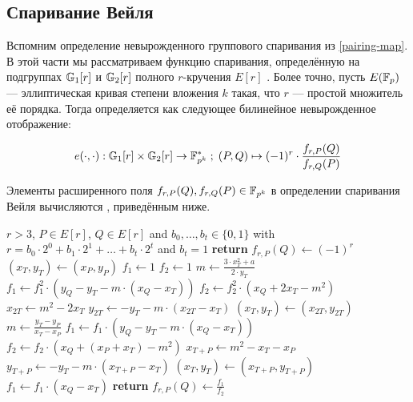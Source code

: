 \subsection{Спаривание Вейля}
\label{sec:weil-pairing} Вспомним определение невырожденного группового спаривания из \ref{pairing-map}. В этой части мы рассматриваем функцию спаривания, определённую на
подгруппах $\mathbb{G}_1[r]$ и $\mathbb{G}_2[r]$ полного $r$-кручения $E[r]$ . Более точно, пусть $E(\mathbb{F}_p)$ — эллиптическая кривая степени вложения $k$ такая, что $r$ — простой множитель её порядка. Тогда  определяется как следующее билинейное невырожденное отображение:

\begin{equation}\label{eq:weil-pairing}
e(\cdot,\cdot) : \mathbb{G}_1[r] \times \mathbb{G}_2[r] \to \mathbb{F}^*_{p^k}\; ;\; 
(P,Q)\mapsto (-1)^r \cdot \frac{f_{r,P}(Q)}{f_{r,Q}(P)}
\end{equation} 

Элементы расширенного поля $f_{r,P}(Q), f_{r,Q}(P)\in \mathbb{F}_{p^k}$ в определении спаривания Вейля вычисляются , приведённым ниже.

\begin{algorithm}\caption{Алгоритм Миллера для  $y^2 = x^3 +ax +b$}\label{alg:millersalgo}
\begin{algorithmic}[0]
\Require $r>3$, $P \in E[r]$, $Q\in E[r]$ and
\State $b_0,\ldots, b_t\in \{0,1\}$ with $r= b_0\cdot 2^0 + b_1\cdot 2^1 + \ldots + b_t\cdot 2^t$ and $b_t=1$
	\State \textbf{return} $f_{r,P}(Q) \gets (-1)^r$
\EndIf
\State $(x_T,y_T) \gets (x_P,y_P)$
\State $f_1\gets 1$
\State $f_2\gets 1$
	\State $m \gets \frac{3\cdot x_T^2+a}{2\cdot y_T}$	
    \State $f_1 \gets f_1^2\cdot (y_Q - y_T - m\cdot(x_Q-x_T))$
	\State $f_2 \gets f_2^2\cdot (x_Q + 2x_T -m^2)$
	\State $x_{2T} \gets m^2 - 2 x_T$
	\State $y_{2T} \gets -y_T - m\cdot (x_{2T}-x_T)$
	\State $(x_T,y_T)\gets (x_{2T},y_{2T})$ 
		\State $m \gets \frac{y_T -y_P}{x_T - x_P}$
		\State $f_1 \gets f_1\cdot (y_Q -y_T -m\cdot (x_Q - x_T))$
		\State $f_2 \gets f_2\cdot (x_Q + (x_P+x_T) - m^2)$
		\State $x_{T+P} \gets m^2 -x_T -x_P$
		\State $y_{T+P}\gets -y_T - m\cdot (x_{T+P}-x_T)$
		\State $(x_T,y_T)\gets (x_{T+P},y_{T+P})$
	\EndIf
\EndFor
\State $f_1 \gets f_1\cdot (x_Q - x_T)$
\State \textbf{return} $f_{r,P}(Q) \gets \frac{f_1}{f_2}$
\EndProcedure
\end{algorithmic}
\end{algorithm}

